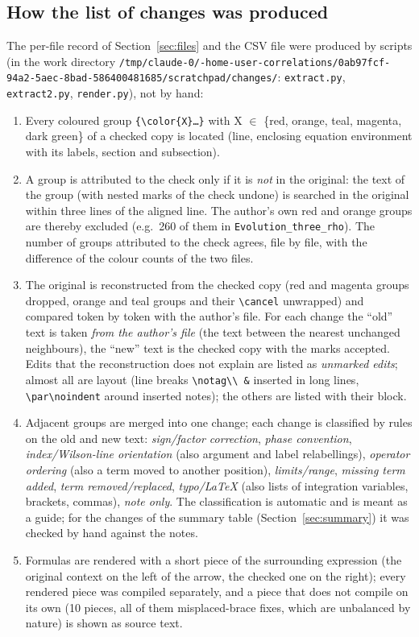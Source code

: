 \documentclass[10pt]{article}
\begin{document}
\subsection{How the list of changes was produced}\label{sec:method}
\noindent The per-file record of Section~\ref{sec:files} and the CSV file were produced by scripts (in the work directory \texttt{/tmp/claude-0/-home-user-correlations/0ab97fcf-94a2-5aec-8bad-586400481685/scratchpad/changes/}: \texttt{extract.py}, \texttt{extract2.py}, \texttt{render.py}), not by hand:
\begin{enumerate}
\item Every coloured group \texttt{\{\textbackslash color\{X\}\dots\}} with X $\in$ \{red, orange, teal, magenta, dark green\} of a checked copy is located (line, enclosing equation environment with its labels, section and subsection).
\item A group is attributed to the check only if it is \emph{not} in the original: the text of the group (with nested marks of the check undone) is searched in the original within three lines of the aligned line. The author's own red and orange groups are thereby excluded (e.g.\ 260 of them in \texttt{Evolution\_three\_rho}). The number of groups attributed to the check agrees, file by file, with the difference of the colour counts of the two files.
\item The original is reconstructed from the checked copy (red and magenta groups dropped, orange and teal groups and their \texttt{\textbackslash cancel} unwrapped) and compared token by token with the author's file. For each change the ``old'' text is taken \emph{from the author's file} (the text between the nearest unchanged neighbours), the ``new'' text is the checked copy with the marks accepted. Edits that the reconstruction does not explain are listed as \emph{unmarked edits}; almost all are layout (line breaks \texttt{\textbackslash notag\textbackslash\textbackslash\ \&} inserted in long lines, \texttt{\textbackslash par\textbackslash noindent} around inserted notes); the others are listed with their block.
\item Adjacent groups are merged into one change; each change is classified by rules on the old and new text: \emph{sign/factor correction}, \emph{phase convention}, \emph{index/Wilson-line orientation} (also argument and label relabellings), \emph{operator ordering} (also a term moved to another position), \emph{limits/range}, \emph{missing term added}, \emph{term removed/replaced}, \emph{typo/LaTeX} (also lists of integration variables, brackets, commas), \emph{note only}. The classification is automatic and is meant as a guide; for the changes of the summary table (Section~\ref{sec:summary}) it was checked by hand against the notes.
\item Formulas are rendered with a short piece of the surrounding expression (the original context on the left of the arrow, the checked one on the right); every rendered piece was compiled separately, and a piece that does not compile on its own (10 pieces, all of them misplaced-brace fixes, which are unbalanced by nature) is shown as source text.
\end{enumerate}
\end{document}
